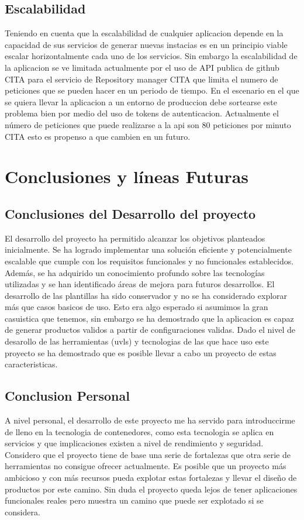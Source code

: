 \documentclass[12pt, a4paper, twoside]{article}
\begin{document}
\subsection{Escalabilidad}
Teniendo en cuenta que la escalabilidad de cualquier aplicacion depende en la capacidad de sus servicios de generar nuevas instacias es en un principio viable 
escalar horizontalmente cada uno de los servicios. Sin embargo la escalabilidad de la aplicacion se ve limitada actualmente por el uso de API publica de github CITA 
para el servicio de Repository manager CITA que limita el numero de peticiones que se pueden hacer en un periodo de tiempo.
En el escenario en el que se quiera llevar la aplicacion a un entorno de produccion debe sortearse este problema bien por medio del uso de tokens de autenticacion.
Actualmente el número de peticiones que puede realizarse a la api son 80 peticiones por minuto CITA esto es propenso a que cambien en un futuro.










\section{Conclusiones y líneas Futuras }


\subsection{Conclusiones del Desarrollo del proyecto}
El desarrollo del proyecto ha permitido alcanzar los objetivos planteados inicialmente. Se ha logrado implementar una solución eficiente y potencialmente escalable que cumple con los requisitos funcionales y no funcionales establecidos. Además, se ha adquirido un conocimiento profundo sobre las tecnologías utilizadas y se han identificado áreas de mejora para futuros desarrollos.
El desarrollo de las plantillas ha sido conservador y no se ha considerado explorar más que casos basicos de uso. Esto era algo esperado si asumimos la gran casuistica que tenemos, sin embargo se ha demostrado que la aplicacion es capaz de generar productos validos a partir de configuraciones validas. Dado el nivel de desarollo de las herramientas (uvls) y tecnologias de las que hace uso este proyecto se ha demostrado que es posible llevar a cabo un proyecto de estas caracteristicas.
\subsection{Conclusion Personal}
A nivel personal, el desarrollo de este proyecto me ha servido para introduccirme de lleno en la tecnologia de contenedores, como esta tecnologia se aplica en servicios y que implicaciones existen a nivel de rendimiento y seguridad. Considero que el proyecto tiene de base una serie de fortalezas que otra serie de herramientas no consigue ofrecer actualmente. Es posible que un proyecto más ambicioso y con más recursos pueda explotar estas fortalezas y llevar el diseño de productos por este camino.
Sin duda el proyecto queda lejos de tener aplicaciones funcionales reales pero muestra un camino que puede ser explotado si se considera. 
\end{document}
